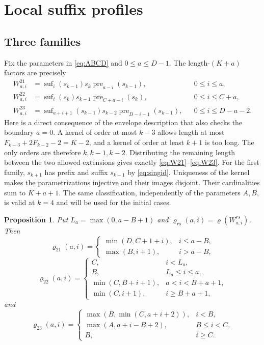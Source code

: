 \documentclass[11pt]{amsart}
\newtheorem{proposition}[theorem]{Proposition}
\newcommand{\pre}{\operatorname{pre}}
\newcommand{\suf}{\operatorname{suf}}
\newcommand{\Rho}{\varrho}
\begin{document}
\section{Local suffix profiles}

\subsection{Three families}
Fix the parameters in \eqref{eq:ABCD} and $0\le a\le D-1$.
The length-$(K+a)$ factors are precisely
\begin{align}
 W^{21}_{a,i}&=\suf_i(s_{k-1})s_k\pre_{a-i}(s_{k-1}),
 &&0\le i\le a,\label{eq:W21}\\
 W^{22}_{a,i}&=\suf_i(s_k)s_{k-1}\pre_{C+a-i}(s_k),
 &&0\le i\le C+a,\label{eq:W22}\\
 W^{23}_{a,i}&=\suf_{a+i+1}(s_{k-1})s_{k-2}\pre_{D-i-1}(s_{k-1}),
 &&0\le i\le D-a-2.\label{eq:W23}
\end{align}
Here is a direct consequence of the envelope description that also
checks the boundary $a=0$.  A kernel of order at most $k-3$ allows length
at most $F_{k-3}+2F_{k-2}-2=K-2$, and a kernel of order at least $k+1$
is too long.  The only orders are therefore $k,k-1,k-2$.
Distributing the remaining length between the two allowed extensions
gives exactly \eqref{eq:W21}--\eqref{eq:W23}.  For the first family,
$s_{k+1}$ has prefix and suffix $s_{k-1}$ by \eqref{eq:singid}.
Uniqueness of the kernel makes the parametrizations injective and their
images disjoint.  Their cardinalities sum to $K+a+1$.
The same classification, independently of the parameters $A,B$, is valid
at $k=4$ and will be used for the initial cases.

\begin{proposition}\label{prop:rho}
Put $L_a=\max(0,a-B+1)$ and
$\Rho_{rs}(a,i)=\Rho(W^{rs}_{a,i})$.  Then
\begin{equation}\label{eq:rho21}
 \Rho_{21}(a,i)=
 \begin{cases}
 \min(D,C+1+i),&i\le a-B,\\
 \max(B,i+1),&i>a-B,
 \end{cases}
\end{equation}
\begin{equation}\label{eq:rho22}
 \Rho_{22}(a,i)=
 \begin{cases}
 C,&i<L_a,\\
 B,&L_a\le i\le a,\\
 \min(C,B+i+1),&a<i<B+a+1,\\
 \min(C,i+1),&i\ge B+a+1,
 \end{cases}
\end{equation}
and
\begin{equation}\label{eq:rho23}
 \Rho_{23}(a,i)=
 \begin{cases}
 \max(B,\min(C,a+i+2)),&i<B,\\
 \max(A,a+i-B+2),&B\le i<C,\\
 B,&i\ge C.
 \end{cases}
\end{equation}
\end{proposition}
\end{document}
